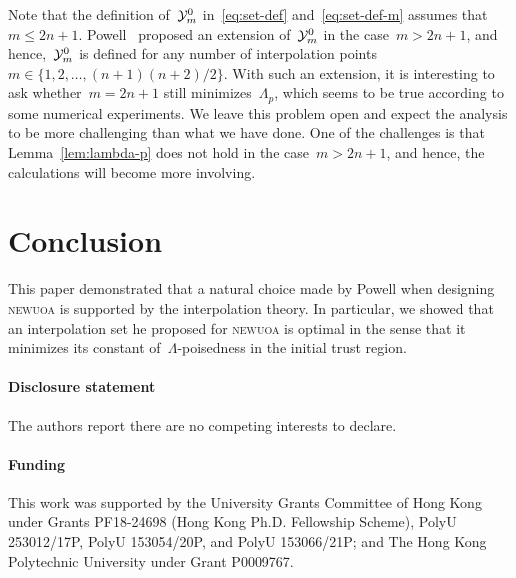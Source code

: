 \documentclass[draft]{article}
\numberwithin{equation}{section}
\theoremstyle{definition}
\theoremstyle{plain}
\newcommand*{\set}[2][]{#1\{#2#1\}}
\newcommand*{\solvername}[1]{\textsc{#1}\xspace}
\newcommand*{\xpt}[1][]{\mathcal{Y}\ifblank{#1}{}{^{#1}}}
\begin{document}
Note that the definition of~$\xpt[0]_m$ in~\eqref{eq:set-def} and~\eqref{eq:set-def-m} assumes that~$m \le 2n + 1$.
Powell~\cite{Powell_2006} proposed an extension of~$\xpt[0]_m$ in the case~$m > 2n + 1$, and hence,~$\xpt[0]_m$ is defined for any number of interpolation points~$m \in \set{1, 2, \dots, (n + 1) (n + 2) / 2}$.
With such an extension, it is interesting to ask whether~$m = 2n + 1$ still minimizes~$\Lambda_p$, which seems to be true according to some numerical experiments.
We leave this problem open and expect the analysis to be more challenging than what we have done.
One of the challenges is that Lemma~\ref{lem:lambda-p} does not hold in the case~$m > 2n + 1$, and hence, the calculations will become more involving.

\section{Conclusion}

This paper demonstrated that a natural choice made by Powell when designing \solvername{newuoa} is supported by the interpolation theory.
In particular, we showed that an interpolation set he proposed for \solvername{newuoa} is optimal in the sense that it minimizes its constant of~$\Lambda$-poisedness in the initial trust region.


\paragraph*{Disclosure statement}
The authors report there are no competing interests to declare.

\paragraph*{Funding}
This work was supported by the University Grants Committee of Hong Kong under Grants PF18-24698 (Hong Kong Ph.D. Fellowship Scheme), PolyU 253012/17P, PolyU 153054/20P, and PolyU 153066/21P; and The Hong Kong Polytechnic University under Grant P0009767.



\end{document}
